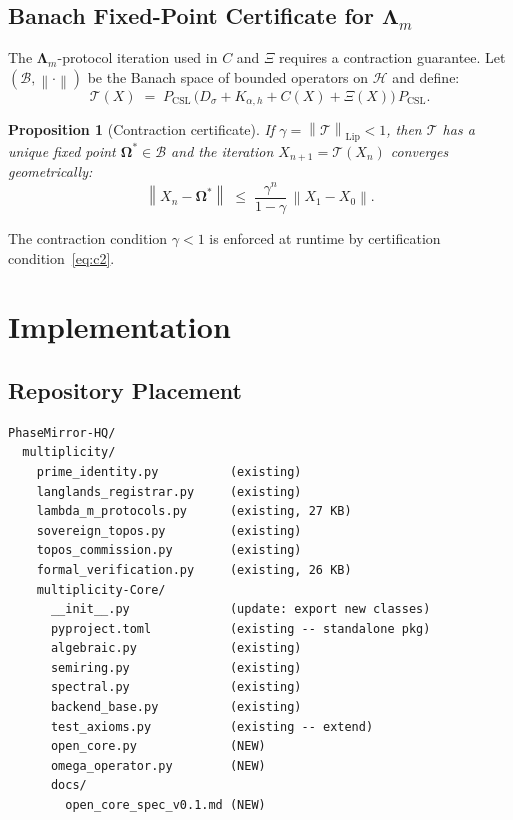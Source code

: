 \documentclass[12pt,a4paper]{article}
\theoremstyle{plain}
\newtheorem{proposition}[theorem]{Proposition}
\theoremstyle{definition}
\theoremstyle{remark}
\newcommand{\Hil}{\mathcal{H}}
\newcommand{\Pcsl}{P_{\mathrm{CSL}}}
\newcommand{\Dsig}{D_{\sigma}}
\newcommand{\Kalpha}{K_{\alpha,h}}
\newcommand{\Lam}{\boldsymbol{\Lambda}_m}
\newcommand{\norm}[1]{\left\lVert #1 \right\rVert}
\begin{document}
\subsection{Banach Fixed-Point Certificate for $\Lam$}
\label{sec:banach}

The $\Lam$-protocol iteration used in $C$ and $\Xi$ requires a
contraction guarantee. Let $(\mathcal{B}, \norm{\cdot})$ be the
Banach space of bounded operators on $\Hil$ and define:
\begin{equation}
  \mathcal{T}(X) \;=\; \Pcsl\,
  \bigl(\Dsig + \Kalpha + C(X) + \Xi(X)\bigr)\, \Pcsl.
  \label{eq:iteration}
\end{equation}

\begin{proposition}[Contraction certificate]
If $\gamma = \norm{\mathcal{T}}_{\mathrm{Lip}} < 1$,
then $\mathcal{T}$ has a unique fixed point
$\boldsymbol{\Omega}^* \in \mathcal{B}$ and the iteration
$X_{n+1} = \mathcal{T}(X_n)$ converges geometrically:
\begin{equation}
  \norm{X_n - \boldsymbol{\Omega}^*} \;\le\;
  \frac{\gamma^n}{1-\gamma}\,\norm{X_1 - X_0}.
  \label{eq:banach}
\end{equation}
\end{proposition}
The contraction condition $\gamma < 1$ is enforced at runtime by
certification condition~\eqref{eq:c2}.

\section{Implementation}
\label{sec:impl}

\subsection{Repository Placement}
\label{sec:placement}

\begin{tcolorbox}[title=Target file tree,colback=gray!6,colframe=gray!40,
  fonttitle=\bfseries\small,breakable]
\begin{verbatim}
PhaseMirror-HQ/
  multiplicity/
    prime_identity.py          (existing)
    langlands_registrar.py     (existing)
    lambda_m_protocols.py      (existing, 27 KB)
    sovereign_topos.py         (existing)
    topos_commission.py        (existing)
    formal_verification.py     (existing, 26 KB)
    multiplicity-Core/
      __init__.py              (update: export new classes)
      pyproject.toml           (existing -- standalone pkg)
      algebraic.py             (existing)
      semiring.py              (existing)
      spectral.py              (existing)
      backend_base.py          (existing)
      test_axioms.py           (existing -- extend)
      open_core.py             (NEW)
      omega_operator.py        (NEW)
      docs/
        open_core_spec_v0.1.md (NEW)
\end{verbatim}
\end{tcolorbox}
\end{document}
